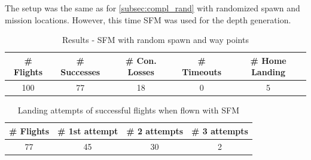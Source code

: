     The setup was the same as for \cref{subsec:compl_rand} with randomized spawn and mission locations. However, this time SFM was used for the depth generation.

    \begin{table}[h]
        \begin{center}
            \caption{Results - SFM with random spawn and way points}\vspace{1ex}
            \label{tab:result_SFM}
            \begin{tabular}{|c|c|c|c|c|}
            \hline
            \# Flights & \# Successes & \# Con. Losses & \# Timeouts & \# Home Landing\\ \hline \hline
            100 & 77 & 18 & 0 & 5 \\ 
            \hline
            \end{tabular}
        \end{center}
    \end{table}

    \begin{table}[h]
        \begin{center}
            \caption{Landing attempts of successful flights when flown with SFM}\vspace{1ex}
            \label{tab:land_nums_SFM}
            \begin{tabular}{|c|c|c|c|}
            \hline
            \# Flights & \# 1st attempt & \# 2 attempts & \# 3 attempts\\ \hline \hline
            77 & 45 & 30 & 2   \\
            \hline
            \end{tabular}
        \end{center}
    \end{table}

